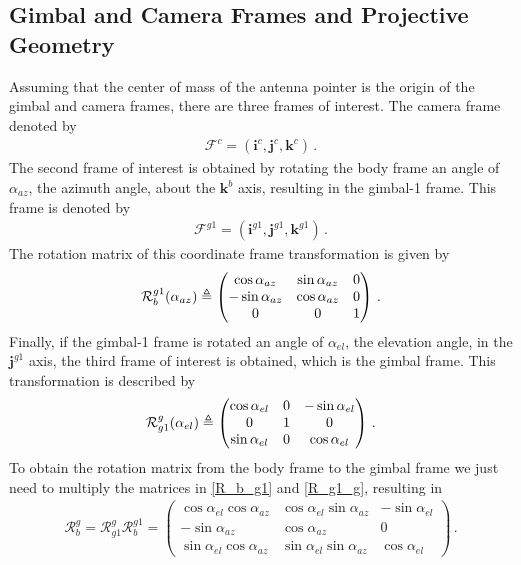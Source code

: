 \subsection{Gimbal and Camera Frames and Projective Geometry}{\label{sub:gimbal_camera_frames}}
Assuming that the center of mass of the antenna pointer is the origin of the gimbal and camera frames, there are three frames of interest. The camera frame denoted by
\begin{align*}
\mathcal{F}^c=(\boldsymbol{i}^c,\boldsymbol{j}^c,\boldsymbol{k}^c)\,.
\end{align*}
The second frame of interest is obtained by rotating the body frame an angle of $\alpha_{az}$, the azimuth angle, about the $\boldsymbol{k}^b$ axis, resulting in the gimbal-1 frame. This frame is denoted by
\begin{align*}
\mathcal{F}^{g1}=(\boldsymbol{i}^{g1},\boldsymbol{j}^{g1},\boldsymbol{k}^{g1})\,.
\end{align*}
The rotation matrix of this coordinate frame transformation is given by
\begin{align}{\label{R_b_g1}}
\mathcal{R}_b^{g1}(\alpha_{az})\triangleq
\begin{pmatrix}
\cos\alpha_{az}  & \sin\alpha_{az} & 0 \\
-\sin\alpha_{az} & \cos\alpha_{az} & 0 \\
0				 & 0			   & 1
\end{pmatrix}\,.
\end{align}
Finally, if the gimbal-1 frame is rotated an angle of $\alpha_{el}$, the elevation angle, in the $\boldsymbol{j}^{g1}$ axis, the third frame of interest is obtained, which is the gimbal frame. This transformation is described by
\begin{align}{\label{R_g1_g}}
\mathcal{R}^g_{g1}(\alpha_{el})\triangleq
\begin{pmatrix}
\cos\alpha_{el} & 0 & -\sin\alpha_{el} \\
0				& 1 & 0				   \\
\sin\alpha_{el} & 0 & \cos\alpha_{el}
\end{pmatrix}\,.
\end{align} 
To obtain the rotation matrix from the body frame to the gimbal frame we just need to multiply the matrices in \ref{R_b_g1} and \ref{R_g1_g}, resulting in
\begin{align}
\mathcal{R}^g_{b}=\mathcal{R}^g_{g1}\mathcal{R}^{g1}_b=
\begin{pmatrix}
\cos\alpha_{el}\cos\alpha_{az} & \cos\alpha_{el}\sin\alpha_{az} & -\sin\alpha_{el} \\
-\sin\alpha_{az} 			   & \cos\alpha_{az} 			  	& 0 			   \\
\sin\alpha_{el}\cos\alpha_{az} & \sin\alpha_{el}\sin\alpha_{az} & \cos\alpha_{el}
\end{pmatrix}\,.
\end{align}

